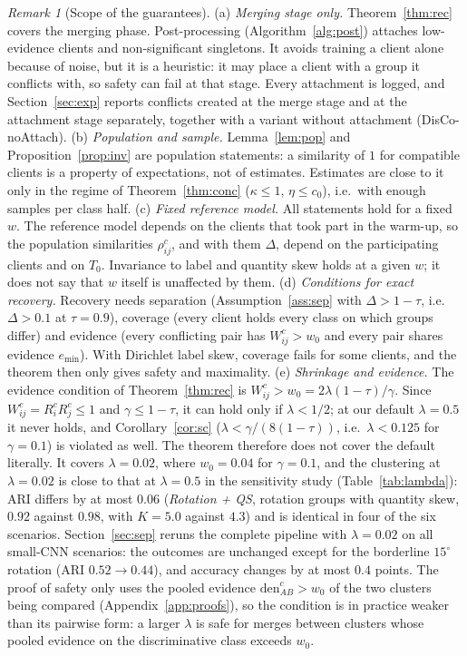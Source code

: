 \documentclass[11pt]{article}
\theoremstyle{definition}
\theoremstyle{remark}
\newtheorem{remark}{Remark}
\begin{document}
\begin{remark}[Scope of the guarantees]\label{rem:scope}
(a) \emph{Merging stage only.} Theorem~\ref{thm:rec} covers the merging phase. Post-processing (Algorithm~\ref{alg:post}) attaches low-evidence clients and non-significant singletons. It avoids training a client alone because of noise, but it is a heuristic: it may place a client with a group it conflicts with, so safety can fail at that stage. Every attachment is logged, and Section~\ref{sec:exp} reports conflicts created at the merge stage and at the attachment stage separately, together with a variant without attachment (DisCo-noAttach).
(b) \emph{Population and sample.} Lemma~\ref{lem:pop} and Proposition~\ref{prop:inv} are population statements: a similarity of $1$ for compatible clients is a property of expectations, not of estimates. Estimates are close to it only in the regime of Theorem~\ref{thm:conc} ($\kappa\le1$, $\eta\le c_0$), i.e.\ with enough samples per class half.
(c) \emph{Fixed reference model.} All statements hold for a fixed $w$. The reference model depends on the clients that took part in the warm-up, so the population similarities $\rho^c_{ij}$, and with them $\Delta$, depend on the participating clients and on $T_0$. Invariance to label and quantity skew holds at a given $w$; it does not say that $w$ itself is unaffected by them.
(d) \emph{Conditions for exact recovery.} Recovery needs separation (Assumption~\ref{ass:sep} with $\Delta>1-\tau$, i.e.\ $\Delta>0.1$ at $\tau=0.9$), coverage (every client holds every class on which groups differ) and evidence (every conflicting pair has $W^c_{ij}>w_0$ and every pair shares evidence $e_{\min}$). With Dirichlet label skew, coverage fails for some clients, and the theorem then only gives safety and maximality.
(e) \emph{Shrinkage and evidence.} The evidence condition of Theorem~\ref{thm:rec} is $W^c_{ij}>w_0=2\lambda(1-\tau)/\gamma$. Since $W^c_{ij}=R_i^cR_j^c\le1$ and $\gamma\le1-\tau$, it can hold only if $\lambda<1/2$; at our default $\lambda=0.5$ it never holds, and Corollary~\ref{cor:sc} ($\lambda<\gamma/(8(1-\tau))$, i.e.\ $\lambda<0.125$ for $\gamma=0.1$) is violated as well. The theorem therefore does not cover the default literally. It covers $\lambda=0.02$, where $w_0=0.04$ for $\gamma=0.1$, and the clustering at $\lambda=0.02$ is close to that at $\lambda=0.5$ in the sensitivity study (Table~\ref{tab:lambda}): ARI differs by at most $0.06$ (\emph{Rotation + QS}, rotation groups with quantity skew, $0.92$ against $0.98$, with $K=5.0$ against $4.3$) and is identical in four of the six scenarios. Section~\ref{sec:sep} reruns the complete pipeline with $\lambda=0.02$ on all small-CNN scenarios: the outcomes are unchanged except for the borderline $15^\circ$ rotation (ARI $0.52\to0.44$), and accuracy changes by at most $0.4$ points. The proof of safety only uses the pooled evidence $\mathrm{den}^c_{AB}>w_0$ of the two clusters being compared (Appendix~\ref{app:proofs}), so the condition is in practice weaker than its pairwise form: a larger $\lambda$ is safe for merges between clusters whose pooled evidence on the discriminative class exceeds $w_0$.

\end{remark}
\end{document}

